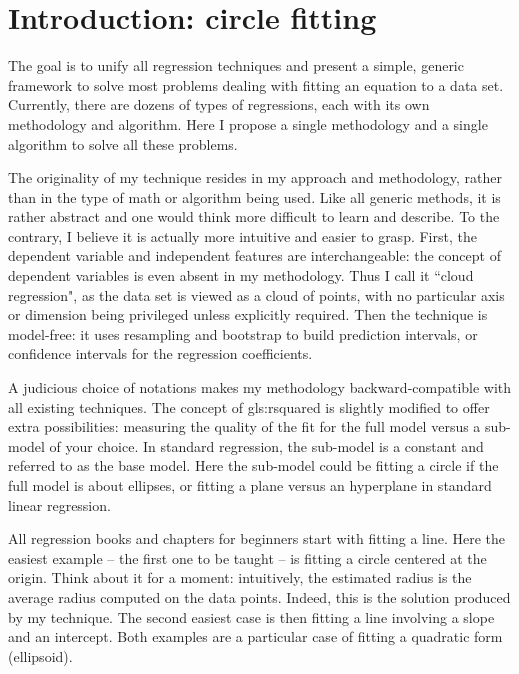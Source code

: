 \documentclass[oneside,10pt]{book}
\begin{document}
\hypersetup{linkcolor=red}



\section{Introduction: circle fitting}\label{circ1}

The goal is to unify all regression techniques and present a simple, generic  framework to solve
 most problems dealing with fitting an equation to a data set. Currently, there are dozens of types of regressions, each with its own
 methodology and algorithm. Here I propose a single methodology and a single algorithm to solve all these problems.

The originality of my technique resides in my approach and methodology, rather than in the type of math or algorithm being used. Like all generic methods, it is rather abstract and  one would think more difficult to learn and describe. To the contrary, I believe it is 
 actually more intuitive and easier to grasp. First,
 the dependent variable and independent features are interchangeable: the concept of dependent variables is even absent in my methodology. Thus I call it ``cloud regression", as the data set is viewed as a cloud of points, with no particular axis or dimension being privileged unless explicitly required. 
 Then the technique is model-free: it uses resampling and bootstrap to build prediction intervals, or confidence intervals for the 
 regression coefficients. 

A judicious choice of notations makes my methodology backward-compatible with all existing techniques. The concept of \gls{gls:rsquared} is slightly modified  
 to offer extra possibilities: measuring the quality of the fit for the full model versus a sub-model of your choice. 
 In standard regression, the sub-model is a constant and referred to as the base model. Here the sub-model could be fitting a circle if the full model 
 is about ellipses, or fitting a plane versus an hyperplane in standard linear regression.

All regression books and chapters for beginners start with fitting a line. Here the easiest example -- the first one to be taught -- is fitting a circle centered at the origin. Think about it for a moment: intuitively, the estimated radius is the average radius computed on the data points. Indeed, this is the solution
 produced by my technique. The second easiest case is then fitting a line involving a slope and an intercept. Both examples are a particular case of fitting a quadratic form (ellipsoid). 
\end{document}
